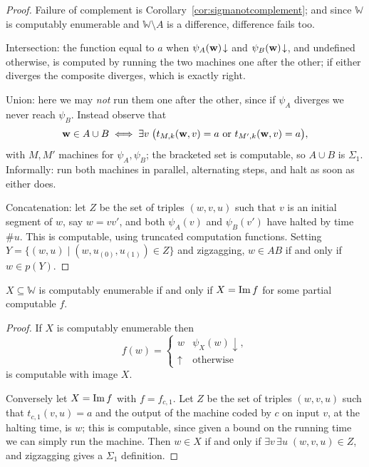 \documentclass[a4paper]{scrartcl}
\newcommand{\WW}{\mathbb{W}}
\begin{document}
\begin{proof}
	Failure of complement is Corollary~\ref{cor:sigmanotcomplement}; and since $\WW$ is computably enumerable and $\WW\setminus A$ is a difference, difference fails too.

	Intersection: the function equal to $a$ when $\psi_A(\mathbf{w})\!\downarrow$ and $\psi_B(\mathbf{w})\!\downarrow$, and undefined otherwise, is computed by running the two machines one after the other; if either diverges the composite diverges, which is exactly right.

	Union: here we may \emph{not} run them one after the other, since if $\psi_A$ diverges we never reach $\psi_B$. Instead observe that
	$$\mathbf{w} \in A \cup B \iff \exists v\;\big(t_{M,k}(\mathbf{w}, v) = a \text{ or } t_{M',k}(\mathbf{w}, v) = a\big),$$
	with $M, M'$ machines for $\psi_A, \psi_B$; the bracketed set is computable, so $A\cup B$ is $\Sigma_1$. Informally: run both machines in parallel, alternating steps, and halt as soon as either does.

	Concatenation: let $Z$ be the set of triples $(w,v,u)$ such that $v$ is an initial segment of $w$, say $w = vv'$, and both $\psi_A(v)$ and $\psi_B(v')$ have halted by time $\#u$. This is computable, using truncated computation functions. Setting $Y = \{(w,u) \mid (w, u_{(0)}, u_{(1)}) \in Z\}$ and zigzagging, $w \in AB$ if and only if $w \in p(Y)$.
\end{proof}

\begin{proposition}\label{prop:ceimage}
	$X \subseteq \WW$ is computably enumerable if and only if $X = \operatorname{Im} f$ for some partial computable $f$.
\end{proposition}

\begin{proof}
	If $X$ is computably enumerable then
	$$f(w) = \begin{cases} w & \psi_X(w)\!\downarrow, \\ \uparrow & \text{otherwise}\end{cases}$$
	is computable with image $X$.

	Conversely let $X = \operatorname{Im} f$ with $f = f_{c,1}$. Let $Z$ be the set of triples $(w,v,u)$ such that $t_{c,1}(v,u) = a$ and the output of the machine coded by $c$ on input $v$, at the halting time, is $w$; this is computable, since given a bound on the running time we can simply run the machine. Then $w \in X$ if and only if $\exists v\,\exists u\; (w,v,u) \in Z$, and zigzagging gives a $\Sigma_1$ definition.
\end{proof}
\end{document}
